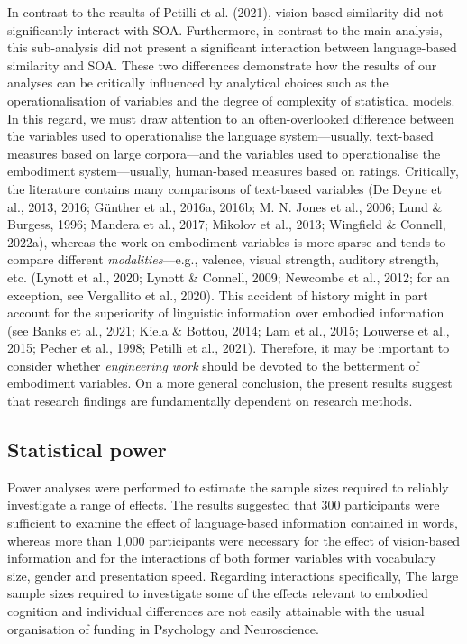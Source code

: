 \documentclass[
  12pt,
  man,floatsintext]{apa7}
\begin{document}
In contrast to the results of Petilli et al. (2021), vision-based similarity did not significantly interact with SOA. Furthermore, in contrast to the main analysis, this sub-analysis did not present a significant interaction between language-based similarity and SOA. These two differences demonstrate how the results of our analyses can be critically influenced by analytical choices such as the operationalisation of variables and the degree of complexity of statistical models. In this regard, we must draw attention to an often-overlooked difference between the variables used to operationalise the language system---usually, text-based measures based on large corpora---and the variables used to operationalise the embodiment system---usually, human-based measures based on ratings. Critically, the literature contains many comparisons of text-based variables (De Deyne et al., 2013, 2016; Günther et al., 2016a, 2016b; M. N. Jones et al., 2006; Lund \& Burgess, 1996; Mandera et al., 2017; Mikolov et al., 2013; Wingfield \& Connell, 2022a), whereas the work on embodiment variables is more sparse and tends to compare different \emph{modalities}---e.g., valence, visual strength, auditory strength, etc. (Lynott et al., 2020; Lynott \& Connell, 2009; Newcombe et al., 2012; for an exception, see Vergallito et al., 2020). This accident of history might in part account for the superiority of linguistic information over embodied information (see Banks et al., 2021; Kiela \& Bottou, 2014; Lam et al., 2015; Louwerse et al., 2015; Pecher et al., 1998; Petilli et al., 2021). Therefore, it may be important to consider whether \emph{engineering work} should be devoted to the betterment of embodiment variables. On a more general conclusion, the present results suggest that research findings are fundamentally dependent on research methods.

\hypertarget{statistical-power}{%
\subsection{Statistical power}\label{statistical-power}}

Power analyses were performed to estimate the sample sizes required to reliably investigate a range of effects. The results suggested that 300 participants were sufficient to examine the effect of language-based information contained in words, whereas more than 1,000 participants were necessary for the effect of vision-based information and for the interactions of both former variables with vocabulary size, gender and presentation speed. Regarding interactions specifically, The large sample sizes required to investigate some of the effects relevant to embodied cognition and individual differences are not easily attainable with the usual organisation of funding in Psychology and Neuroscience.
\end{document}
